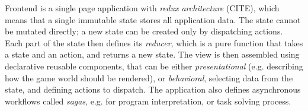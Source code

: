Frontend is a single page application with \emph{redux architecture} (CITE),
which means that a single immutable state stores all application data.
The state cannot be mutated directly; a new state can be created only
by dispatching actions.
Each part of the state then defines its \emph{reducer},
which is a pure function that takes a state and an action, and returns a new state.
The view is then assembled using declarative reusable components, that can
be either \emph{presentational} (e.g. describing how the game world should be
rendered), or \emph{behavioral}, selecting data from the state, %
and defining actions to dispatch. %
The application also defines asynchronous workflows called \emph{sagas},
e.g. for program interpretation, or task solving process. %
%


